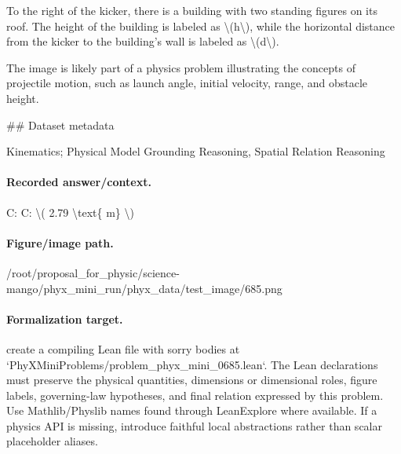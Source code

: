 To the right of the kicker, there is a building with two standing figures on its roof. The height of the building is labeled as \textbackslash{}(h\textbackslash{}), while the horizontal distance from the kicker to the building's wall is labeled as \textbackslash{}(d\textbackslash{}). 

The image is likely part of a physics problem illustrating the concepts of projectile motion, such as launch angle, initial velocity, range, and obstacle height.

\#\# Dataset metadata

Kinematics; Physical Model Grounding Reasoning, Spatial Relation Reasoning

\paragraph{Recorded answer/context.}
C: C: \textbackslash{}( 2.79 \textbackslash{}text\{ m\} \textbackslash{})

\paragraph{Figure/image path.}
/root/proposal\_for\_physic/science-mango/phyx\_mini\_run/phyx\_data/test\_image/685.png

\paragraph{Formalization target.}
create a compiling Lean file with sorry bodies at `PhyXMiniProblems/problem\_phyx\_mini\_0685.lean`. The Lean declarations must preserve the physical quantities, dimensions or dimensional roles, figure labels, governing-law hypotheses, and final relation expressed by this problem.
Use Mathlib/Physlib names found through LeanExplore where available. If a physics API is missing, introduce faithful local abstractions rather than scalar placeholder aliases.

